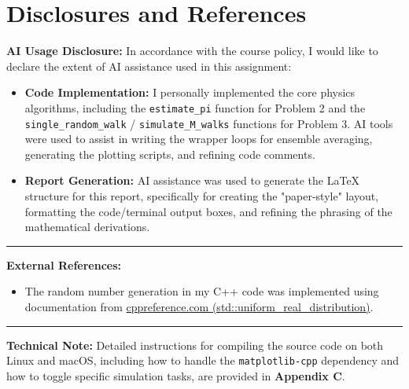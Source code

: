 \documentclass{article}
\begin{document}





\section*{Disclosures and References}
\textbf{AI Usage Disclosure:} In accordance with the course policy, I would like to declare the extent of AI assistance used in this assignment:
\begin{itemize}
    \item \textbf{Code Implementation:} I personally implemented the core physics algorithms, including the \texttt{estimate\_pi} function for Problem 2 and the \texttt{single\_random\_walk} / \texttt{simulate\_M\_walks} functions for Problem 3. AI tools were used to assist in writing the wrapper loops for ensemble averaging, generating the plotting scripts, and refining code comments.
    \item \textbf{Report Generation:} AI assistance was used to generate the LaTeX structure for this report, specifically for creating the "paper-style" layout, formatting the code/terminal output boxes, and refining the phrasing of the mathematical derivations.
\end{itemize}
\vspace{0.5cm}
\hrule
\vspace{0.5cm}
\textbf{External References:} 
\begin{itemize}
    \item The random number generation in my C++ code was implemented using documentation from \href{https://en.cppreference.com/w/cpp/numeric/random/uniform_real_distribution}{cppreference.com (std::uniform\_real\_distribution)}.
\end{itemize}
\vspace{0.5cm}
\hrule
\vspace{0.5cm}
\textbf{Technical Note:} Detailed instructions for compiling the source code on both Linux and macOS, including how to handle the \texttt{matplotlib-cpp} dependency and how to toggle specific simulation tasks, are provided in \textbf{Appendix C}.



\end{document}
